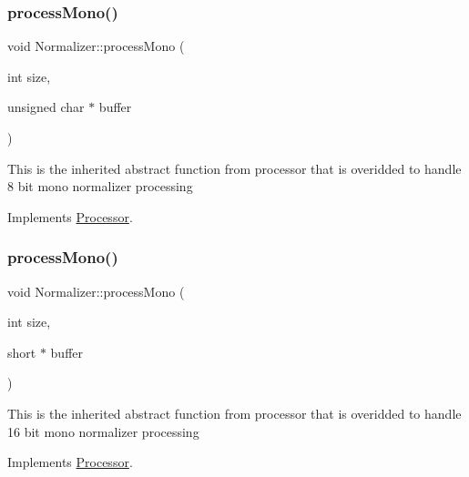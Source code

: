 \subsubsection{\texorpdfstring{process\+Mono()}{processMono()}\hspace{0.1cm}{\footnotesize\ttfamily [1/2]}}
{\footnotesize\ttfamily void Normalizer\+::process\+Mono (\begin{DoxyParamCaption}\item[{int}]{size,  }\item[{unsigned char $\ast$}]{buffer }\end{DoxyParamCaption})\hspace{0.3cm}{\ttfamily [virtual]}}

This is the inherited abstract function from processor that is overidded to handle 8 bit mono normalizer processing 

Implements \hyperlink{classProcessor_aae6af1473510f56839f3e15328962fb0}{Processor}.

\mbox{\label{classNormalizer_aa997755adc989a2b6610cfd944824bdc}} 
\subsubsection{\texorpdfstring{process\+Mono()}{processMono()}\hspace{0.1cm}{\footnotesize\ttfamily [2/2]}}
{\footnotesize\ttfamily void Normalizer\+::process\+Mono (\begin{DoxyParamCaption}\item[{int}]{size,  }\item[{short $\ast$}]{buffer }\end{DoxyParamCaption})\hspace{0.3cm}{\ttfamily [virtual]}}

This is the inherited abstract function from processor that is overidded to handle 16 bit mono normalizer processing 

Implements \hyperlink{classProcessor_ab24fa87b5eb6246cf8599756b3b5862d}{Processor}.

\mbox{\label{classNormalizer_aa9d9a19237a6b208ead3a9cc96b07451}} 
